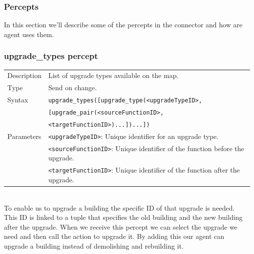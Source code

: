 \subsubsection{Percepts}
In this section we'll describe some of the percepts in the connector and how are agent uses them.

	\subsubsection*{upgrade\_types percept}
		\begin{small}
			\begin{tabular}{p{2cm}p{9cm}}
				Description 	& List of upgrade types available on the map.\\
				Type 		& Send on change.\\
				Syntax 	& \verb|upgrade_types([upgrade_type(<upgradeTypeID>,|\\
						& \verb|[upgrade_pair(<sourceFunctionID>, |\\
						& \verb|<targetFunctionID>)...])...])|\\
				Parameters 	& \verb|<upgradeTypeID>|: Unique identifier for an upgrade type.\\
						& \verb|<sourceFunctionID>|: Unique identifier of the function before the upgrade.\\
						& \verb|<targetFunctionID>|:  Unique identifier of the function after the upgrade.\\
			\end{tabular}
		\end{small}
	\\To enable us to upgrade a building the specific ID of that upgrade is needed. This ID is linked to a tuple that specifies the old building and the new building after the upgrade. When we receive this percept we can select the upgrade we need and then call the action to upgrade it. By adding this our agent can upgrade a building instead of demolishing and rebuilding it.

